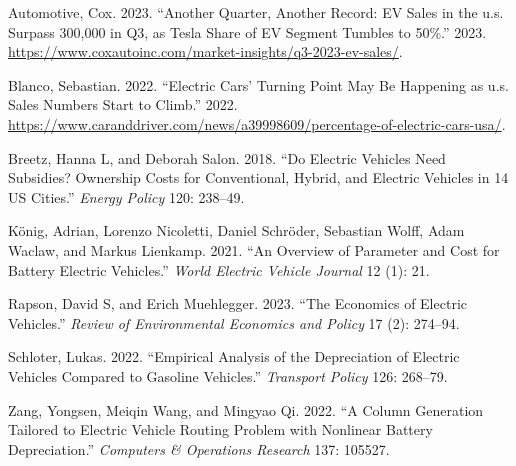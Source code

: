 \documentclass{article}
\newlength{\cslhangindent}
\newlength{\cslentryspacingunit} %
\newenvironment{CSLReferences}[2] %
 {%
  \setlength{\parindent}{0pt}
  \ifodd #1
  \let\oldpar\par
  \def\par{\hangindent=\cslhangindent\oldpar}
  \fi
  \setlength{\parskip}{#2\cslentryspacingunit}
 }%
 {}
\begin{document}
\hypertarget{refs}{}
\begin{CSLReferences}{1}{0}
\leavevmode{}%
Automotive, Cox. 2023. {``Another Quarter, Another Record: EV Sales in
the u.s. Surpass 300,000 in Q3, as Tesla Share of EV Segment Tumbles to
50\%.''} 2023.
\url{https://www.coxautoinc.com/market-insights/q3-2023-ev-sales/}.

\leavevmode{}%
Blanco, Sebastian. 2022. {``Electric Cars' Turning Point May Be
Happening as u.s. Sales Numbers Start to Climb.''} 2022.
\url{https://www.caranddriver.com/news/a39998609/percentage-of-electric-cars-usa/}.

\leavevmode{}%
Breetz, Hanna L, and Deborah Salon. 2018. {``Do Electric Vehicles Need
Subsidies? Ownership Costs for Conventional, Hybrid, and Electric
Vehicles in 14 US Cities.''} \emph{Energy Policy} 120: 238--49.

\leavevmode{}%
König, Adrian, Lorenzo Nicoletti, Daniel Schröder, Sebastian Wolff, Adam
Waclaw, and Markus Lienkamp. 2021. {``An Overview of Parameter and Cost
for Battery Electric Vehicles.''} \emph{World Electric Vehicle Journal}
12 (1): 21.

\leavevmode{}%
Rapson, David S, and Erich Muehlegger. 2023. {``The Economics of
Electric Vehicles.''} \emph{Review of Environmental Economics and
Policy} 17 (2): 274--94.

\leavevmode{}%
Schloter, Lukas. 2022. {``Empirical Analysis of the Depreciation of
Electric Vehicles Compared to Gasoline Vehicles.''} \emph{Transport
Policy} 126: 268--79.

\leavevmode{}%
Zang, Yongsen, Meiqin Wang, and Mingyao Qi. 2022. {``A Column Generation
Tailored to Electric Vehicle Routing Problem with Nonlinear Battery
Depreciation.''} \emph{Computers \& Operations Research} 137: 105527.

\end{CSLReferences}



\end{document}
